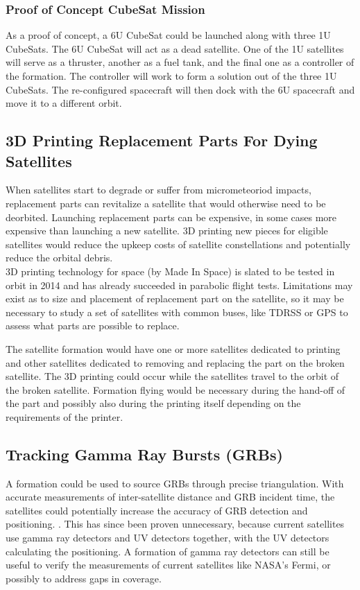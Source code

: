 \subsubsection{Proof of Concept CubeSat Mission}
As a proof of concept, a 6U CubeSat could be launched along with three 1U CubeSats. The 6U CubeSat will act as a dead satellite. One of the 1U satellites will serve as a thruster, another as a fuel tank, and the final one as a controller of the formation. The controller will work to form a solution out of the three 1U CubeSats. The re-configured spacecraft will then dock with the 6U spacecraft and move it to a different orbit.

\subsection{3D Printing Replacement Parts For Dying Satellites}

When satellites start to degrade or suffer from micrometeoriod impacts, replacement parts can revitalize a satellite that would otherwise need to be deorbited. Launching replacement parts can be expensive, in some cases more expensive than launching a new satellite. 3D printing new pieces for eligible satellites would reduce the upkeep costs of satellite constellations and potentially reduce the orbital debris.  \\

3D printing technology for space (by Made In Space) is slated to be tested in orbit in 2014 and has already succeeded in parabolic flight tests. Limitations may exist as to size and placement of replacement part on the satellite, so it may be necessary to study a set of satellites with common buses, like TDRSS or GPS to assess what parts are possible to replace. 

The satellite formation would have one or more satellites dedicated to printing and other satellites dedicated to removing and replacing the part on the broken satellite. The 3D printing could occur while the satellites travel to the orbit of the broken satellite. Formation flying would be necessary during the hand-off of the part and possibly also during the printing itself depending on the requirements of the printer. 

\subsection{Tracking Gamma Ray Bursts (GRBs)}
A formation could be used to source GRBs through precise triangulation. With accurate measurements of inter-satellite distance and GRB incident time, the satellites could potentially increase the accuracy of GRB detection and positioning. \cite{Ref:Dill}. This has since been proven unnecessary, because current satellites use gamma ray detectors and UV detectors together, with the UV detectors calculating the positioning. A formation of gamma ray detectors can still be useful to verify the measurements of current satellites like NASA's Fermi, or possibly to address gaps in coverage. 

